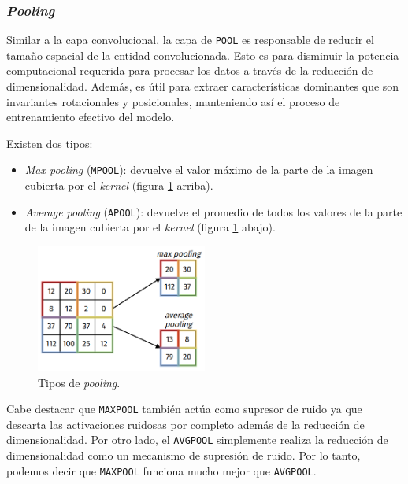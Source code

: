 \documentclass[a4paper,12pt]{article}
\begin{document}
\subsubsection{\textit{Pooling}}

Similar a la capa convolucional, la capa de \texttt{POOL} es responsable de reducir el tamaño espacial de la entidad convolucionada. Esto es para disminuir la potencia computacional requerida para procesar los datos a través de la reducción de dimensionalidad. Además, es útil para extraer características dominantes que son invariantes rotacionales y posicionales, manteniendo así el proceso de entrenamiento efectivo del modelo.

Existen dos tipos:
\begin{itemize}[noitemsep, topsep=2pt]
	\item \textit{Max pooling} (\texttt{MPOOL}): devuelve el valor máximo de la parte de la imagen cubierta por el \textit{kernel} (figura \ref{fig:type-pooling} arriba).
	\item \textit{Average pooling} (\texttt{APOOL}): devuelve el promedio de todos los valores de la parte de la imagen cubierta por el \textit{kernel} (figura \ref{fig:type-pooling} abajo).
\end{itemize}

\begin{figure}[H]
	\begin{center}				
		\includegraphics[width=0.5\textwidth]{tesis_45.png}
		\caption{Tipos de \textit{pooling}.}
		\label{fig:type-pooling}
	\end{center}
\end{figure}

Cabe destacar que \texttt{MAXPOOL} también actúa como supresor de ruido ya que descarta las activaciones ruidosas por completo además de la reducción de dimensionalidad. Por otro lado, el \texttt{AVGPOOL} simplemente realiza la reducción de dimensionalidad como un mecanismo de supresión de ruido. Por lo tanto, podemos decir que \texttt{MAXPOOL} funciona mucho mejor que \texttt{AVGPOOL}.
\end{document}
